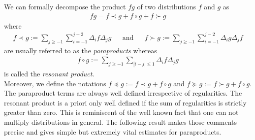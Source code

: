 \documentclass[11pt, oneside]{article}   	%
\begin{document}
We can formally decompose the product $fg$ of two distributions $f$ and $g$ as  
\begin{align*}
fg=f\prec g+f\circ g+f\succ g
\end{align*}
where
\begin{align*}
f\prec g :=\sum_{j\ge -1} \sum_{i=-1} ^{j-2} \Delta_i f \Delta_j g 
&&\text{and}&& f\succ g:= \sum_{j \ge -1} \sum_{i=-1}^{j-2} \Delta_i g \Delta_j f
\end{align*}
are usually referred to as the \textit{paraproducts} whereas 
\begin{align} \label{equ:resonantpro}
f\circ g:=\sum_{j\geq-1}\sum_{|i-j|\leq 1}\Delta_i f \Delta_j g 
\end{align} 
is called the \textit{resonant product}. \\
Moreover, we define the notations $f\preccurlyeq g:=f\prec g+f\circ g$ and $f\succcurlyeq g:=f\succ g+f\circ g$.\\
The paraproduct terms are always well defined irrespective of regularities.
The resonant product is a priori only well defined if the sum of regularities is strictly greater than zero. This is reminiscent of the well known 
fact that one can not multiply distributions in general.
The following result makes those comments precise and gives simple but extremely vital estimates for paraproducts.
\end{document}

